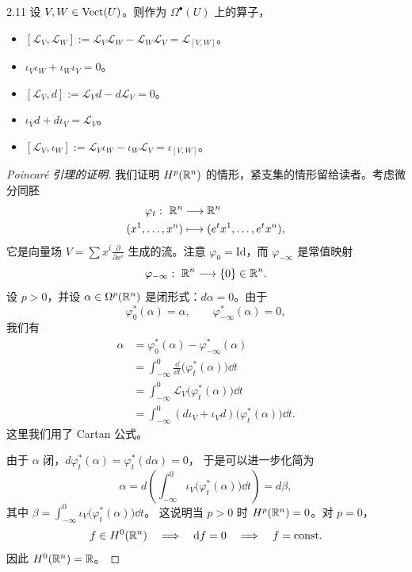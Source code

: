 \begin{wprop}{2.11}
  设 $V,W\in\operatorname{Vect}(U)$。则作为 $\Omega^{\bullet}(U)$ 上的算子，
  \begin{itemize}[leftmargin=1.6em,itemsep=0.25em,topsep=0.2em]
    \item $[\mathcal{L}_{V},\mathcal{L}_{W}]
          :=\mathcal{L}_{V}\mathcal{L}_{W}-\mathcal{L}_{W}\mathcal{L}_{V}
          =\mathcal{L}_{[V,W]}$。
    \item $\iota_{V}\iota_{W}+\iota_{W}\iota_{V}=0$。
    \item $[\mathcal{L}_{V},d]:=\mathcal{L}_{V}d-d\mathcal{L}_{V}=0$。
    \item $\iota_{V}d+d\iota_{V}=\mathcal{L}_{V}$。
    \item $[\mathcal{L}_{V},\iota_{W}]
          :=\mathcal{L}_{V}\iota_{W}-\iota_{W}\mathcal{L}_{V}
          =\iota_{[V,W]}$。
  \end{itemize}
\end{wprop}

\begin{proof}[Poincaré 引理的证明]
  我们证明 $H^{p}(\mathbb{R}^{n})$ 的情形，紧支集的情形留给读者。考虑微分同胚
  \[
    \begin{aligned}
      \varphi_{t}:\ \mathbb{R}^{n}&\longrightarrow\mathbb{R}^{n}\\
      (x^{1},\ldots,x^{n})&\longmapsto(e^{t}x^{1},\ldots,e^{t}x^{n}),
    \end{aligned}
  \]
  它是向量场 $V=\sum x^{i}\frac{\partial}{\partial x^{i}}$ 生成的流。注意
  $\varphi_{0}=\mathrm{Id}$，而 $\varphi_{-\infty}$ 是常值映射
  \[
    \varphi_{-\infty}:\ \R^{n}\longrightarrow\{0\}\in\R^{n}.
  \]
  设 $p>0$，并设 $\alpha\in\Omega^{p}(\mathbb{R}^{n})$ 是闭形式：$d\alpha=0$。由于
  \[
    \varphi_{0}^{*}(\alpha)=\alpha,\qquad
    \varphi_{-\infty}^{*}(\alpha)=0,
  \]
  我们有
  \[
    \begin{aligned}
      \alpha&=\varphi_{0}^{*}(\alpha)-\varphi_{-\infty}^{*}(\alpha)\\
      &=\int_{-\infty}^{0}\frac{\dd}{\dd t}\big(\varphi_{t}^{*}(\alpha)\big)\dd t\\
      &=\int_{-\infty}^{0}\mathcal{L}_{V}\big(\varphi_{t}^{*}(\alpha)\big)\dd t\\
      &=\int_{-\infty}^{0}(d\iota_{V}+\iota_{V}d)\big(\varphi_{t}^{*}(\alpha)\big)\dd t.
    \end{aligned}
  \]
  这里我们用了 Cartan 公式。

  由于 $\alpha$ 闭，$d\varphi_{t}^{*}(\alpha)=\varphi_{t}^{*}(d\alpha)=0$，
  于是可以进一步化简为
  \[
    \alpha=d\left(\int_{-\infty}^{0}\iota_{V}\big(\varphi_{t}^{*}(\alpha)\big)
    \dd t\right)=d\beta,
  \]
  其中 $\beta=\int_{-\infty}^{0}\iota_{V}\big(\varphi_{t}^{*}(\alpha)\big)\dd t$。
  这说明当 $p>0$ 时 $H^{p}(\mathbb{R}^{n})=0$。对 $p=0$，
  \[
    f\in H^{0}(\mathbb{R}^{n})\quad\Longrightarrow\quad \mathrm{d} f=0
    \quad\Longrightarrow\quad f=\mathrm{const}.
  \]
  因此 $H^{0}(\mathbb{R}^{n})=\mathbb{R}$。
\end{proof}

